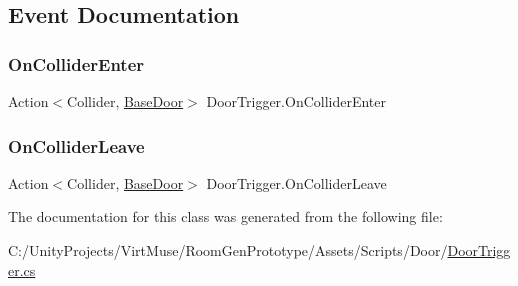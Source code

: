 \subsection{Event Documentation}
\mbox{\label{class_door_trigger_aaf26dd7fb0f0ce643f5fd50805e2b4e0}} 
\subsubsection{\texorpdfstring{On\+Collider\+Enter}{OnColliderEnter}}
{\footnotesize\ttfamily Action$<$Collider, \mbox{\hyperlink{class_base_door}{Base\+Door}}$>$ Door\+Trigger.\+On\+Collider\+Enter}

\mbox{\label{class_door_trigger_af00f29ad47c5853b9f8ff03048223e30}} 
\subsubsection{\texorpdfstring{On\+Collider\+Leave}{OnColliderLeave}}
{\footnotesize\ttfamily Action$<$Collider, \mbox{\hyperlink{class_base_door}{Base\+Door}}$>$ Door\+Trigger.\+On\+Collider\+Leave}



The documentation for this class was generated from the following file\+:\begin{DoxyCompactItemize}
\item 
C\+:/\+Unity\+Projects/\+Virt\+Muse/\+Room\+Gen\+Prototype/\+Assets/\+Scripts/\+Door/\mbox{\hyperlink{_door_trigger_8cs}{Door\+Trigger.\+cs}}\end{DoxyCompactItemize}
